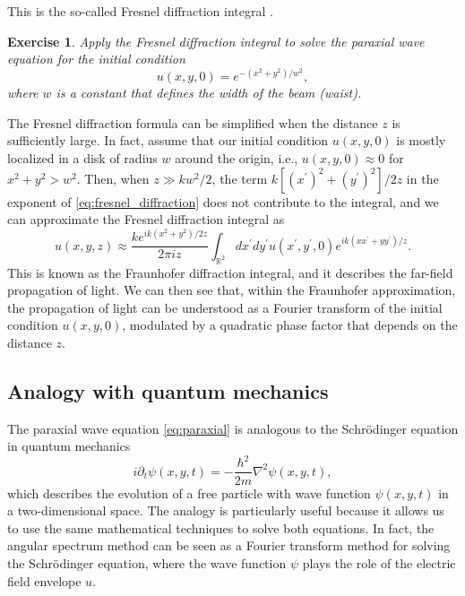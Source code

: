\documentclass[a4paper,10pt]{report}
\newtheorem{exe}{Exercise}
\begin{document}
This is the so-called Fresnel diffraction integral \cite{goodman2017introduction, schmidt2010numerical}.

\begin{exe}
    Apply the Fresnel diffraction integral to solve the paraxial wave equation for the initial condition
    \begin{equation}
        u(x,y,0) = e^{-(x^2+y^2)/w^2},
    \end{equation}
    where $w$ is a constant that defines the width of the beam (waist). 
\end{exe}

The Fresnel diffraction formula can be simplified when the distance $z$ is sufficiently large. In fact, assume that our initial condition $u(x,y,0)$ is mostly localized in a disk of radius $w$ around the origin, i.e., $u(x,y,0) \approx 0$ for $x^2+y^2 > w^2$. Then, when $z \gg kw^2/2$, the term $k[(x^\prime)^2 + (y^\prime)^2] / 2z$ in the exponent of \eqref{eq:fresnel_diffraction} does not contribute to the integral, and we can approximate the Fresnel diffraction integral as
\begin{equation}
    u(x,y,z) \approx \frac{k e^{ik\left( x^2 + y^2 \right) / 2z}}{2\pi i z} \int_{\mathbb{R}^2} dx^\prime dy^\prime u(x^\prime,y^\prime,0) e^{ik\left( xx^\prime + yy^\prime \right) / z}.
\end{equation}
This is known as the Fraunhofer diffraction integral, and it describes the far-field propagation of light. We can then see that, within the Fraunhofer approximation, the propagation of light can be understood as a Fourier transform of the initial condition $u(x,y,0)$, modulated by a quadratic phase factor that depends on the distance $z$.

\subsection{Analogy with quantum mechanics}

The paraxial wave equation \eqref{eq:paraxial} is analogous to the Schrödinger equation in quantum mechanics
\begin{equation}
    i \partial_t \psi(x, y, t) = -\frac{\hbar^2}{2m} \nabla^2 \psi(x, y, t),
\end{equation}
which describes the evolution of a free particle with wave function $\psi(x, y, t)$ in a two-dimensional space. The analogy is particularly useful because it allows us to use the same mathematical techniques to solve both equations. In fact, the angular spectrum method can be seen as a Fourier transform method for solving the Schrödinger equation, where the wave function $\psi$ plays the role of the electric field envelope $u$.
\end{document}
